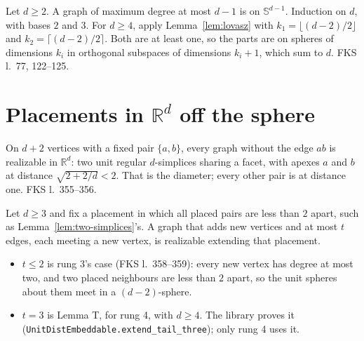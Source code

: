 \begin{proposition}
  \label{prop:maxdeg}
  \leanok
  Let $d \ge 2$. A graph of maximum degree at most $d - 1$ is on $\mathbb{S}^{d-1}$.
  Induction on $d$, with bases $2$ and $3$. For $d \ge 4$, apply Lemma~\ref{lem:lovasz} with
  $k_1 = \lfloor (d-2)/2 \rfloor$ and $k_2 = \lceil (d-2)/2 \rceil$. Both are at least one,
  so the parts are on spheres of dimensions $k_i$ in orthogonal subspaces of dimensions
  $k_i + 1$, which sum to $d$. FKS l.~77, 122--125.
\end{proposition}

\section{Placements in $\mathbb{R}^d$ off the sphere}

\begin{lemma}
  \label{lem:two-simplices}
  \leanok
  On $d + 2$ vertices with a fixed pair $\{a, b\}$, every graph without the edge $ab$ is
  realizable in $\mathbb{R}^d$: two unit regular $d$-simplices sharing a facet, with apexes
  $a$ and $b$ at distance $\sqrt{2 + 2/d} < 2$. That is the diameter; every other pair is at
  distance one. FKS l.~355--356.
\end{lemma}

\begin{lemma}
  \label{lem:tail}
  \leanok
  Let $d \ge 3$ and fix a placement in which all placed pairs are less than $2$ apart, such
  as Lemma~\ref{lem:two-simplices}'s. A graph that adds new vertices and at most $t$ edges,
  each meeting a new vertex, is realizable extending that placement.
  \begin{itemize}
    \item $t \le 2$ is rung 3's case (FKS l.~358--359): every new vertex has degree at most
      two, and two placed neighbours are less than $2$ apart, so the unit spheres about them
      meet in a $(d-2)$-sphere.
    \item $t = 3$ is Lemma T, for rung 4, with $d \ge 4$. The library proves it
      (\texttt{UnitDistEmbeddable.extend\_tail\_three}); only rung 4 uses it.
  \end{itemize}
\end{lemma}

